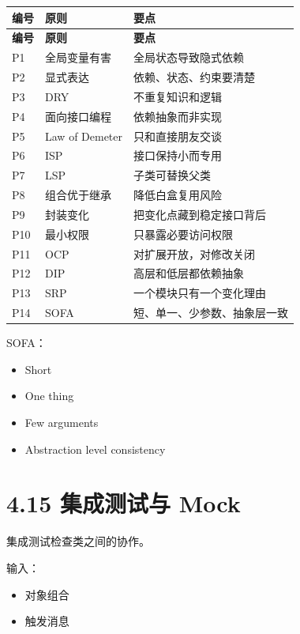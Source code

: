 \documentclass[UTF8,zihao=-4]{ctexart}
\begin{document}
{
\footnotesize
\begin{longtable}{|>{\raggedright\arraybackslash}p{}|>{\raggedright\arraybackslash}p{}|>{\raggedright\arraybackslash}p{}|}
\hline
\textbf{编号} & \textbf{原则} & \textbf{要点} \\
\hline
\endfirsthead
\hline
\textbf{编号} & \textbf{原则} & \textbf{要点} \\
\hline
\endhead
P1 & 全局变量有害 & 全局状态导致隐式依赖 \\
\hline
P2 & 显式表达 & 依赖、状态、约束要清楚 \\
\hline
P3 & DRY & 不重复知识和逻辑 \\
\hline
P4 & 面向接口编程 & 依赖抽象而非实现 \\
\hline
P5 & Law of Demeter & 只和直接朋友交谈 \\
\hline
P6 & ISP & 接口保持小而专用 \\
\hline
P7 & LSP & 子类可替换父类 \\
\hline
P8 & 组合优于继承 & 降低白盒复用风险 \\
\hline
P9 & 封装变化 & 把变化点藏到稳定接口背后 \\
\hline
P10 & 最小权限 & 只暴露必要访问权限 \\
\hline
P11 & OCP & 对扩展开放，对修改关闭 \\
\hline
P12 & DIP & 高层和低层都依赖抽象 \\
\hline
P13 & SRP & 一个模块只有一个变化理由 \\
\hline
P14 & SOFA & 短、单一、少参数、抽象层一致 \\
\hline
\end{longtable}
}


SOFA：

\begin{itemize}
\item Short
\item One thing
\item Few arguments
\item Abstraction level consistency
\end{itemize}

\section{4.15 集成测试与 Mock}

集成测试检查类之间的协作。

输入：

\begin{itemize}
\item 对象组合
\item 触发消息
\end{itemize}
\end{document}
